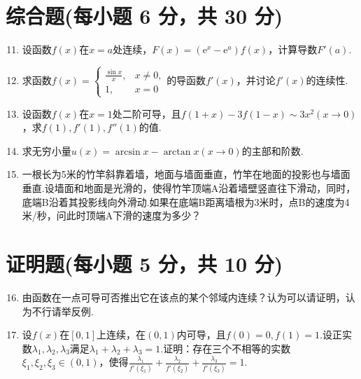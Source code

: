 \documentclass[../main.tex]{subfiles}
\begin{document}
\section{综合题(每小题 6 分，共 30 分)}
\begin{enumerate}
    \setcounter{enumi}{10}
    \item 设函数$f(x)$在$x=a$处连续，$F(x)=(\mathrm{e}^{x}-\mathrm{e}^{a})f(
              x)$，计算导数$F'(a)$.
          \vspace{10em}

    \item 求函数$f(x)=
              \begin{cases}
                  \frac{\sin x}{x}, & x\neq0, \\
                  1,                & x=0
              \end{cases}$的导函数$f'(x)$，并讨论$f'(x)$的连续性.
          \vspace{10em}

    \item 设函数$f(x)$在$x=1$处二阶可导，且$f(1+x)-3f(1-x)\sim 3x^{2}(x\to 0
              )$，求$f(1),f'(1),f''(1)$的值.
          \vspace{10em}

    \item 求无穷小量$u(x)=\arcsin x-\arctan x(x\to0)$的主部和阶数.
          \vspace{10em}

    \item 一根长为5米的竹竿斜靠着墙，地面与墙面垂直，竹竿在地面的投影也与墙面垂直.设墙面和地面是光滑的，使得竹竿顶端A沿着墙壁竖直往下滑动，同时，底端B沿着其投影线向外滑动.如果在底端B距离墙根为3米时，点B的速度为4米/秒，问此时顶端A下滑的速度为多少？
          \vspace{12em}
\end{enumerate}

\section{证明题(每小题 5 分，共 10 分)}
\begin{enumerate}
    \setcounter{enumi}{15}
    \item 由函数在一点可导可否推出它在该点的某个邻域内连续？认为可以请证明，认为不行请举反例.
          \vspace{12em}

    \item 设$f(x)$在$[0,1]$上连续，在$(0,1)$内可导，且$f(0)=0,f(1)=1$.设正实数$\lambda
              _{1},\lambda_{2},\lambda_{3}$满足$\lambda_{1}+\lambda_{2}+\lambda_{3}=1$.证明：存在三个不相等的实数$\xi
              _{1},\xi_{2},\xi_{3}\in(0,1)$，使得$\frac{\lambda_{1}}{f'(\xi_{1})}+\frac{\lambda_{2}}{f'(\xi_{2})}
              +\frac{\lambda_{3}}{f'(\xi_{3})}=1$.
          \vspace{12em}
\end{enumerate}
\end{document}
